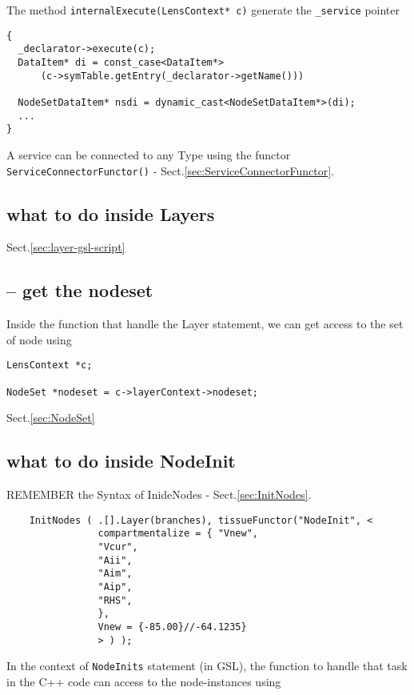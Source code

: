 \begin{enumerate}
The method \verb!internalExecute(LensContext* c)! generate the \verb!_service!
pointer
\begin{verbatim}
{
  _declarator->execute(c);
  DataItem* di = const_case<DataItem*>
      (c->symTable.getEntry(_declarator->getName()))
  
  NodeSetDataItem* nsdi = dynamic_cast<NodeSetDataItem*>(di);
  ...
}
\end{verbatim} 


\end{enumerate}



A service can be connected to any Type using the functor
\verb!ServiceConnectorFunctor()! - Sect.\ref{sec:ServiceConnectorFunctor}.


\subsection{what to do inside Layers}

Sect.\ref{sec:layer-gsl-script}

\subsection{-- get the nodeset}
\label{sec:lenscontext-get-nodeset}

Inside the function that handle the Layer statement, we can get access to the
set of node using
\begin{verbatim}
LensContext *c;

NodeSet *nodeset = c->layerContext->nodeset;
\end{verbatim}
Sect.\ref{sec:NodeSet}


\subsection{what to do inside NodeInit}
\label{sec:doNodeInit-TissueFunctor}
\label{sec:TissueFunctor-doNodeInit}

REMEMBER the Syntax of InideNodes - Sect.\ref{sec:InitNodes}.

\begin{verbatim}
	InitNodes ( .[].Layer(branches), tissueFunctor("NodeInit", <
				compartmentalize = { "Vnew", 
				"Vcur", 
				"Aii", 
				"Aim", 
				"Aip", 
				"RHS", 
				},
				Vnew = {-85.00}//-64.1235}
				> ) );

\end{verbatim}


In the context of \verb!NodeInits! statement (in GSL), the function to
handle that task in the C++ code can access to the node-instances using

